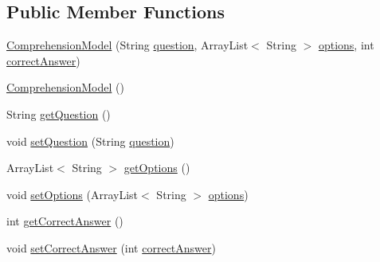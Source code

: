 \subsection*{Public Member Functions}
\begin{DoxyCompactItemize}
\item 
\hyperlink{classorg_1_1buildmlearn_1_1toolkit_1_1templates_1_1ComprehensionModel_a4d66f880a049307549b47d43f83af685}{Comprehension\+Model} (String \hyperlink{classorg_1_1buildmlearn_1_1toolkit_1_1templates_1_1ComprehensionModel_a51f7dca2d72fbd6cbbd8bcaea754d2e2}{question}, Array\+List$<$ String $>$ \hyperlink{classorg_1_1buildmlearn_1_1toolkit_1_1templates_1_1ComprehensionModel_a382cd02fa193b35fa27ece6b261330fe}{options}, int \hyperlink{classorg_1_1buildmlearn_1_1toolkit_1_1templates_1_1ComprehensionModel_a2c3c90f22361d85df799d962c1bdba9e}{correct\+Answer})
\item 
\hyperlink{classorg_1_1buildmlearn_1_1toolkit_1_1templates_1_1ComprehensionModel_a34d038e815cda0478bd01d100ff584c4}{Comprehension\+Model} ()
\item 
String \hyperlink{classorg_1_1buildmlearn_1_1toolkit_1_1templates_1_1ComprehensionModel_af97f8349e6f4f0571a19622eca03d82d}{get\+Question} ()
\item 
void \hyperlink{classorg_1_1buildmlearn_1_1toolkit_1_1templates_1_1ComprehensionModel_aa8fb699cc68d78bb0e40f0e02f19aee7}{set\+Question} (String \hyperlink{classorg_1_1buildmlearn_1_1toolkit_1_1templates_1_1ComprehensionModel_a51f7dca2d72fbd6cbbd8bcaea754d2e2}{question})
\item 
Array\+List$<$ String $>$ \hyperlink{classorg_1_1buildmlearn_1_1toolkit_1_1templates_1_1ComprehensionModel_adb8c422c770d32ae9984397f767b9974}{get\+Options} ()
\item 
void \hyperlink{classorg_1_1buildmlearn_1_1toolkit_1_1templates_1_1ComprehensionModel_a3cff92cd5d50d36f9f3befd346d04055}{set\+Options} (Array\+List$<$ String $>$ \hyperlink{classorg_1_1buildmlearn_1_1toolkit_1_1templates_1_1ComprehensionModel_a382cd02fa193b35fa27ece6b261330fe}{options})
\item 
int \hyperlink{classorg_1_1buildmlearn_1_1toolkit_1_1templates_1_1ComprehensionModel_ad2ec835f46b50c0b3951c10f09b42b98}{get\+Correct\+Answer} ()
\item 
void \hyperlink{classorg_1_1buildmlearn_1_1toolkit_1_1templates_1_1ComprehensionModel_ad956030a8462e0e2bb7e3224b5b0e0f6}{set\+Correct\+Answer} (int \hyperlink{classorg_1_1buildmlearn_1_1toolkit_1_1templates_1_1ComprehensionModel_a2c3c90f22361d85df799d962c1bdba9e}{correct\+Answer})

\end{DoxyCompactItemize}
